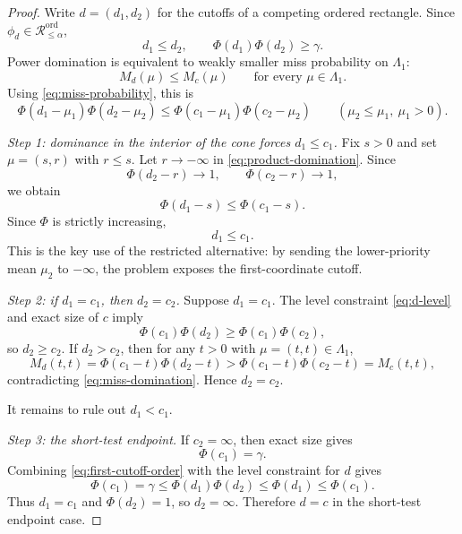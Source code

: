 \documentclass[12pt]{article}
\theoremstyle{definition}
\theoremstyle{remark}
\begin{document}
\begin{proof}
Write $d=(d_1,d_2)$ for the cutoffs of a competing ordered rectangle. Since $\phi_d\in\mathcal R^{\mathrm{ord}}_{\le\alpha}$,
\begin{equation}\label{eq:d-level}
d_1\le d_2,
\qquad
\Phi(d_1)\Phi(d_2)\ge \gamma.
\end{equation}
Power domination is equivalent to weakly smaller miss probability on $\Lambda_1$:
\begin{equation}\label{eq:miss-domination}
M_d(\mu)
\le
M_c(\mu)
\qquad\text{for every }\mu\in\Lambda_1.
\end{equation}
Using \eqref{eq:miss-probability}, this is
\begin{equation}\label{eq:product-domination}
\Phi(d_1-\mu_1)\Phi(d_2-\mu_2)
\le
\Phi(c_1-\mu_1)\Phi(c_2-\mu_2)
\qquad(\mu_2\le\mu_1,\ \mu_1>0).
\end{equation}

\emph{Step 1: dominance in the interior of the cone forces $d_1\le c_1$.}
Fix $s>0$ and set $\mu=(s,r)$ with $r\le s$. Let $r\to-\infty$ in \eqref{eq:product-domination}. Since
\[
\Phi(d_2-r)\to1,
\qquad
\Phi(c_2-r)\to1,
\]
we obtain
\[
\Phi(d_1-s)\le\Phi(c_1-s).
\]
Since $\Phi$ is strictly increasing,
\begin{equation}\label{eq:first-cutoff-order}
d_1\le c_1.
\end{equation}
This is the key use of the restricted alternative: by sending the lower-priority mean $\mu_2$ to $-\infty$, the problem exposes the first-coordinate cutoff.

\emph{Step 2: if $d_1=c_1$, then $d_2=c_2$.}
Suppose $d_1=c_1$. The level constraint \eqref{eq:d-level} and exact size of $c$ imply
\[
\Phi(c_1)\Phi(d_2)
\ge
\Phi(c_1)\Phi(c_2),
\]
so $d_2\ge c_2$. If $d_2>c_2$, then for any $t>0$ with $\mu=(t,t)\in\Lambda_1$,
\[
M_d(t,t)
=\Phi(c_1-t)\Phi(d_2-t)
>
\Phi(c_1-t)\Phi(c_2-t)
=M_c(t,t),
\]
contradicting \eqref{eq:miss-domination}. Hence $d_2=c_2$.

It remains to rule out $d_1<c_1$.

\emph{Step 3: the short-test endpoint.}
If $c_2=\infty$, then exact size gives
\[
\Phi(c_1)=\gamma.
\]
Combining \eqref{eq:first-cutoff-order} with the level constraint for $d$ gives
\[
\Phi(c_1)
=\gamma
\le
\Phi(d_1)\Phi(d_2)
\le
\Phi(d_1)
\le
\Phi(c_1).
\]
Thus $d_1=c_1$ and $\Phi(d_2)=1$, so $d_2=\infty$. Therefore $d=c$ in the short-test endpoint case.


\end{proof}
\end{document}
